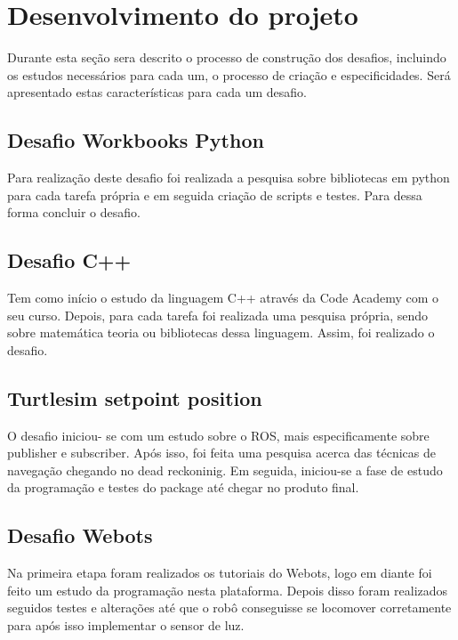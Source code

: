 \chapter{Desenvolvimento do projeto}
\label{chap:metod}


Durante esta seção sera descrito o processo de construção dos desafios, incluindo os estudos necessários para cada um, o processo de criação e especificidades. Será apresentado estas características para cada um desafio.

\section{Desafio Workbooks Python}

Para realização deste desafio foi realizada a pesquisa sobre bibliotecas em python para cada tarefa própria e em seguida criação de scripts e testes. Para dessa forma concluir o desafio.



\section{Desafio C++}

Tem como início o estudo da linguagem C++ através da Code Academy com o seu curso. Depois, para cada tarefa foi realizada uma pesquisa própria, sendo sobre matemática teoria ou bibliotecas dessa linguagem. Assim, foi realizado o desafio.

\section{Turtlesim setpoint position}

O desafio iniciou- se com um estudo sobre o ROS, mais especificamente sobre publisher e subscriber. Após isso, foi feita uma pesquisa acerca das técnicas de navegação chegando no dead reckoninig. Em seguida, iniciou-se a fase de estudo da programação e testes do package até chegar no produto final.

\section{Desafio Webots}

Na primeira etapa foram realizados os tutoriais do Webots, logo em diante foi feito um estudo da programação nesta plataforma. Depois disso foram realizados seguidos testes e alterações até que o robô conseguisse se locomover corretamente para após isso implementar o sensor de luz.

